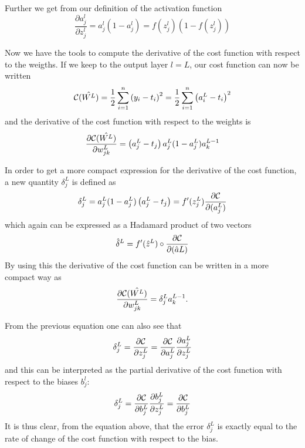 \documentclass[a4paper,12pt]{article}
\begin{document}
Further we get from our definition of the activation function
\begin{equation}
    \frac{\partial a_j^l}{\partial z_j^{l}} = a_j^l(1-a_j^l)=f(z_j^l)(1-f(z_j^l))
\end{equation}

Now we have the tools to compute the derivative of the cost function with respect to the weigths. If we keep to the output layer $l=L$, our cost function can now be written
\begin{equation}
    {\cal C}(\hat{W^L})  =  \frac{1}{2}\sum_{i=1}^n\left(y_i - t_i\right)^2=\frac{1}{2}\sum_{i=1}^n\left(a_i^L - t_i\right)^2
\end{equation}
and the derivative of the cost function with respect to the weights is
\begin{equation}
    \frac{\partial{\cal C}(\hat{W^L})}{\partial w_{jk}^L}  =  \left(a_j^L - t_j\right)a_j^L(1-a_j^L)a_k^{L-1}
\end{equation}

In order to get a more compact expression for the derivative of the cost function, a new quantity $\delta_j^L$ is defined as
\begin{equation}
    \delta_j^L = a_j^L(1-a_j^L)\left(a_j^L - t_j\right) = f'(z_j^L)\frac{\partial {\cal C}}{\partial (a_j^L)}
\end{equation}
which again can be expressed as a Hadamard product of two vectors
\begin{equation}
    \hat{\delta}^L = f'(\hat{z}^L)\circ\frac{\partial {\cal C}}{\partial (\hat{a}L)}
\end{equation}
By using this the derivative of the cost function can be written in a more compact way as
\begin{equation}
    \frac{\partial{\cal C}(\hat{W^L})}{\partial w_{jk}^L}  =  \delta_j^La_k^{L-1}.
\end{equation}

From the previous equation one can also see that
\begin{equation}
    \delta_j^L =\frac{\partial {\cal C}}{\partial z_j^L}= \frac{\partial {\cal C}}{\partial a_j^L}\frac{\partial a_j^L}{\partial z_j^L}
\end{equation}
and this can be interpreted as the partial derivative of the cost function with respect to the biases $b_j^l$:
\begin{equation}
    \delta_j^L = \frac{\partial {\cal C}}{\partial b_j^L}\frac{\partial b_j^L}{\partial z_j^L}=\frac{\partial {\cal C}}{\partial b_j^L}
\end{equation}
It is thus clear, from the equation above, that the error $\delta_j^L$ is exactly equal to the rate of change of the cost function with respect to the bias.\newline
\end{document}
